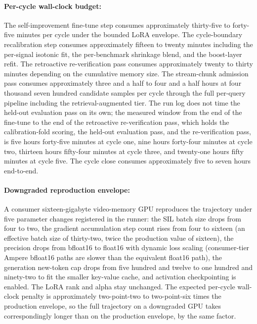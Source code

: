 \paragraph{Per-cycle wall-clock budget:} The self-improvement fine-tune step consumes approximately thirty-five to forty-five minutes per cycle under the bounded LoRA envelope. The cycle-boundary recalibration step consumes approximately fifteen to twenty minutes including the per-signal isotonic fit, the per-benchmark shrinkage blend, and the boost-layer refit. The retroactive re-verification pass consumes approximately twenty to thirty minutes depending on the cumulative memory size. The stream-chunk admission pass consumes approximately three and a half to four and a half hours at four thousand seven hundred candidate samples per cycle through the full per-query pipeline including the retrieval-augmented tier. The run log does not time the held-out evaluation pass on its own; the measured window from the end of the fine-tune to the end of the retroactive re-verification pass, which holds the calibration-fold scoring, the held-out evaluation pass, and the re-verification pass, is five hours forty-five minutes at cycle one, nine hours forty-four minutes at cycle two, thirteen hours fifty-four minutes at cycle three, and twenty-one hours fifty minutes at cycle five. The cycle close consumes approximately five to seven hours end-to-end.

\paragraph{Downgraded reproduction envelope:} A consumer sixteen-gigabyte video-memory GPU reproduces the trajectory under five parameter changes registered in the runner: the SIL batch size drops from four to two, the gradient accumulation step count rises from four to sixteen (an effective batch size of thirty-two, twice the production value of sixteen), the precision drops from bfloat16 to float16 with dynamic loss scaling (consumer-tier Ampere bfloat16 paths are slower than the equivalent float16 path), the generation new-token cap drops from five hundred and twelve to one hundred and ninety-two to fit the smaller key-value cache, and activation checkpointing is enabled. The LoRA rank and alpha stay unchanged. The expected per-cycle wall-clock penalty is approximately two-point-two to two-point-six times the production envelope, so the full trajectory on a downgraded GPU takes correspondingly longer than on the production envelope, by the same factor.


